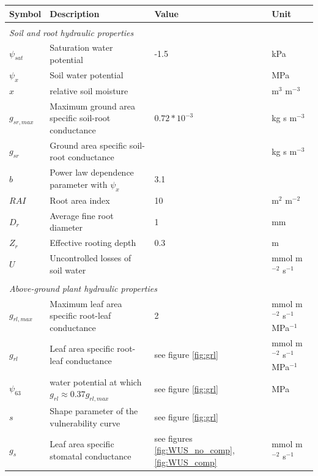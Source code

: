 \documentclass[utf8]{frontiersSCNS} %
\begin{document}
\begin{table}[h]
    \centering
    \begin{tabular}{l l l l}
        Symbol & Description & Value & Unit \\
        \hline
        \multicolumn{4}{l}{}\\
        \multicolumn{4}{l}{\textit{Soil and root hydraulic properties}}\\
        \hline
        $\psi_{sat}$ & Saturation water potential & -1.5 & kPa\\
        $\psi_x$ & Soil water potential & & MPa\\
        $x$ & relative soil moisture & & m$^{3}$ m$^{-3}$\\
        $g_{sr,max}$ & Maximum ground area specific soil-root conductance & $0.72 * 10^{-3}$ & kg s m$^{-3}$ \\
        $g_{sr}$ & Ground area specific soil-root conductance & & kg s m$^{-3}$\\
        $b$ & Power law dependence parameter with $\psi_x$ & 3.1 & \\
        $RAI$ & Root area index & 10 & m$^{2}$ m$^{-2}$\\
        $D_r$ & Average fine root diameter & 1 & mm \\
        $Z_r$ & Effective rooting depth & 0.3 & m\\ 
        $U$ & Uncontrolled losses of soil water & & mmol m$^{-2}$ s$^{-1}$\\
        \hline
        \multicolumn{4}{l}{}\\
        \multicolumn{4}{l}{\textit{Above-ground plant hydraulic properties}}\\
        \hline
        $g_{rl,max}$ & Maximum leaf area specific root-leaf conductance & 2 & mmol m$^{-2}$ s$^{-1}$ MPa$^{-1}$ \\
        $g_{rl}$ & Leaf area specific root-leaf conductance & see figure \ref{fig:grl} & mmol m$^{-2}$ s$^{-1}$ MPa$^{-1}$ \\
        $\psi_{63}$ & water potential at which $g_{rl} \approx 0.37 g_{rl,max}$ & see figure \ref{fig:grl} & MPa \\
        $s$ & Shape parameter of the vulnerability curve & see figure \ref{fig:grl} &  \\
        $g_s$ & Leaf area specific stomatal conductance & see figures \ref{fig:WUS_no_comp}, \ref{fig:WUS_comp} & mmol m$^{-2}$ s$^{-1}$ \\

\end{tabular}
\end{table}
\end{document}
